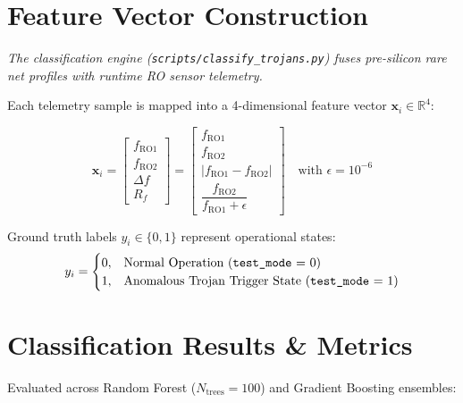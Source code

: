 \documentclass[11pt,a4paper,oneside]{book}
\begin{document}
\section{Feature Vector Construction}

{\itshape
The classification engine (\texttt{scripts/classify\_trojans.py}) fuses pre-silicon rare net profiles with runtime RO sensor telemetry.
}

Each telemetry sample is mapped into a 4-dimensional feature vector $\mathbf{x}_i \in \mathbb{R}^4$:

\begin{equation}
\mathbf{x}_i = \begin{bmatrix}
  f_{\text{RO1}} \\[4pt]
  f_{\text{RO2}} \\[4pt]
  \Delta f \\[4pt]
  R_f
\end{bmatrix} = \begin{bmatrix}
  f_{\text{RO1}} \\[4pt]
  f_{\text{RO2}} \\[4pt]
  |f_{\text{RO1}} - f_{\text{RO2}}| \\[4pt]
  \dfrac{f_{\text{RO2}}}{f_{\text{RO1}} + \epsilon}
\end{bmatrix}
\quad \text{with } \epsilon = 10^{-6}
\end{equation}

Ground truth labels $y_i \in \{0, 1\}$ represent operational states:
\begin{equation}
y_i = \begin{cases}
  0, & \text{Normal Operation (\texttt{test\_mode} = 0)} \\
  1, & \text{Anomalous Trojan Trigger State (\texttt{test\_mode} = 1)}
\end{cases}
\end{equation}

\section{Classification Results \& Metrics}

Evaluated across Random Forest ($N_{\text{trees}}=100$) and Gradient Boosting ensembles:
\end{document}
